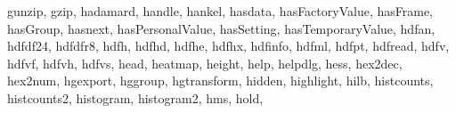 {{        gunzip,%
        gzip,%
        hadamard,%
        handle,%
        hankel,%
        hasdata,%
        hasFactoryValue,%
        hasFrame,%
        hasGroup,%
        hasnext,%
        hasPersonalValue,%
        hasSetting,%
        hasTemporaryValue,%
        hdfan,%
        hdfdf24,%
        hdfdfr8,%
        hdfh,%
        hdfhd,%
        hdfhe,%
        hdfhx,%
        hdfinfo,%
        hdfml,%
        hdfpt,%
        hdfread,%
        hdfv,%
        hdfvf,%
        hdfvh,%
        hdfvs,%
        head,%
        heatmap,%
        height,%
        help,%
        helpdlg,%
        hess,%
        hex2dec,%
        hex2num,%
        hgexport,%
        hggroup,%
        hgtransform,%
        hidden,%
        highlight,%
        hilb,%
        histcounts,%
        histcounts2,%
        histogram,%
        histogram2,%
        hms,%
        hold,%
}}
